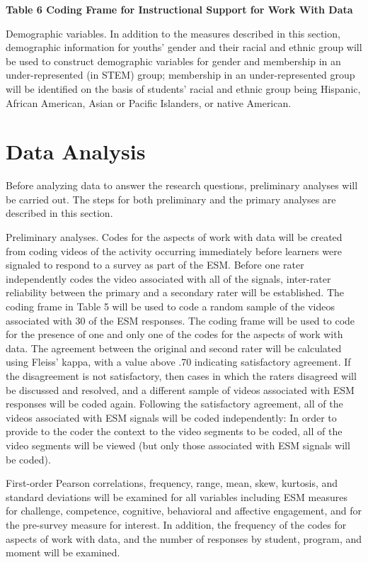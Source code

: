 \documentclass[]{msu-thesis}
\theoremstyle{definition}
\theoremstyle{definition}
\theoremstyle{definition}
\theoremstyle{remark}
\begin{document}
\textbf{Table 6 Coding Frame for Instructional Support for Work With
Data}

Demographic variables. In addition to the measures described in this
section, demographic information for youths' gender and their racial and
ethnic group will be used to construct demographic variables for gender
and membership in an under-represented (in STEM) group; membership in an
under-represented group will be identified on the basis of students'
racial and ethnic group being Hispanic, African American, Asian or
Pacific Islanders, or native American.

\section{Data Analysis}\label{data-analysis}

Before analyzing data to answer the research questions, preliminary
analyses will be carried out. The steps for both preliminary and the
primary analyses are described in this section.

Preliminary analyses. Codes for the aspects of work with data will be
created from coding videos of the activity occurring immediately before
learners were signaled to respond to a survey as part of the ESM. Before
one rater independently codes the video associated with all of the
signals, inter-rater reliability between the primary and a secondary
rater will be established. The coding frame in Table 5 will be used to
code a random sample of the videos associated with 30 of the ESM
responses. The coding frame will be used to code for the presence of one
and only one of the codes for the aspects of work with data. The
agreement between the original and second rater will be calculated using
Fleiss' kappa, with a value above .70 indicating satisfactory agreement.
If the disagreement is not satisfactory, then cases in which the raters
disagreed will be discussed and resolved, and a different sample of
videos associated with ESM responses will be coded again. Following the
satisfactory agreement, all of the videos associated with ESM signals
will be coded independently: In order to provide to the coder the
context to the video segments to be coded, all of the video segments
will be viewed (but only those associated with ESM signals will be
coded).

First-order Pearson correlations, frequency, range, mean, skew,
kurtosis, and standard deviations will be examined for all variables
including ESM measures for challenge, competence, cognitive, behavioral
and affective engagement, and for the pre-survey measure for interest.
In addition, the frequency of the codes for aspects of work with data,
and the number of responses by student, program, and moment will be
examined.
\end{document}
